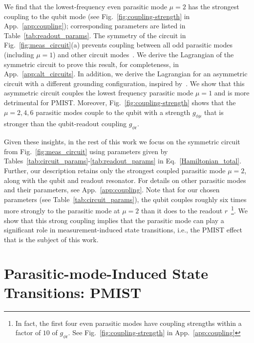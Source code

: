 \documentclass[%
reprint,
superscriptaddress,
 amsmath,amssymb,
 aps,
 prx,
longbibliography,
floatfix,
]{revtex4-2}
\begin{document}
We find that the lowest-frequency even parasitic mode $\mu=2$ has the strongest coupling to the qubit mode (see Fig.~\ref{fig:coupling-strength} in App.~\ref{app:coupling}); corresponding parameters are listed in Table~\ref{tab:readout_params}. The symmetry of the circuit in Fig.~\ref{fig:meas_circuit}(a) prevents coupling between all odd parasitic modes (including $\mu=1$) and other circuit modes~\cite{viola2015collective}. We derive the Lagrangian of the symmetric circuit to prove this result, for completeness, in App.~\ref{app:alt_circuits}. In addition, we derive the Lagrangian for an asymmetric circuit with a different grounding configuration, inspired by~\cite{zhang_universal_2021}. We show that this asymmetric circuit couples the lowest frequency parasitic mode $\mu=1$ and is more detrimental for PMIST. Moreover, Fig.~\ref{fig:coupling-strength} shows that the $\mu=2,4,6$ parasitic modes couple to the qubit with a strength $g_{\phi\mu}$ that is stronger than the qubit-readout coupling $g_{\phi \textrm{r}}$.

Given these insights, in the rest of this work we focus on the symmetric circuit from Fig.~\ref{fig:meas_circuit} using parameters given by Tables~\ref{tab:circuit_params}-\ref{tab:readout_params} in Eq.~\ref{Hamiltonian_total}. Further, our description retains only the strongest coupled parasitic mode $\mu = 2$, along with the qubit and readout resonator. For details on other parasitic modes and their parameters, see App.~\ref{app:coupling}. Note that for our chosen parameters (see Table~\ref{tab:circuit_params}), the qubit couples roughly six times more strongly to the parasitic mode at $\mu=2$ than it does to the readout $r$~\footnote{In fact, the first four even parasitic modes have coupling strengths within a factor of $10$ of $g_{\phi \textrm{r}}$. See Fig.~\ref{fig:coupling-strength} in App.~\ref{app:coupling}}. We show that this strong coupling implies that the parasitic mode can play a significant role in measurement-induced state transitions, i.e., the PMIST effect that is the subject of this work.

\section{Parasitic-mode-Induced State Transitions: PMIST}\label{sec:MIST}
\end{document}
